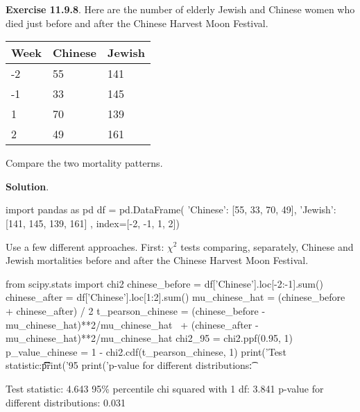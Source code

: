 \textbf{Exercise 11.9.8}. Here are the number of elderly Jewish and
Chinese women who died just before and after the Chinese Harvest Moon
Festival.
\begin{table}[H]
\centering
\begin{tabular}{@{}lll@{}}
\toprule
Week & Chinese & Jewish \\
\midrule
-2 & 55 & 141 \\
-1 & 33 & 145 \\
1 & 70 & 139 \\
2 & 49 & 161 \\
\bottomrule
\end{tabular}
\end{table}
Compare the two mortality patterns.

\textbf{Solution}.

\begin{python}
import pandas as pd
df = pd.DataFrame({
    'Chinese': [55, 33, 70, 49],
    'Jewish':  [141, 145, 139, 161]
}, index=[-2, -1, 1, 2])
\end{python}
Use a few different approaches.
First: \(\chi^{2}\) tests comparing, separately, Chinese and Jewish
mortalities before and after the Chinese Harvest Moon Festival.

\begin{python}
from scipy.stats import chi2
chinese_before = df['Chinese'].loc[-2:-1].sum()
chinese_after = df['Chinese'].loc[1:2].sum()
mu_chinese_hat = (chinese_before + chinese_after) / 2
t_pearson_chinese = (chinese_before - mu_chinese_hat)**2/mu_chinese_hat \
    + (chinese_after - mu_chinese_hat)**2/mu_chinese_hat
chi2_95 = chi2.ppf(0.95, 1)
p_value_chinese = 1 - chi2.cdf(t_pearson_chinese, 1)
print('Test statistic:\t\t\t\t%
print('95%
print('p-value for different distributions:\t%
\end{python}
\begin{console}
Test statistic:                         4.643
95\% percentile chi squared with 1 df:   3.841
p-value for different distributions:    0.031
\end{console}

